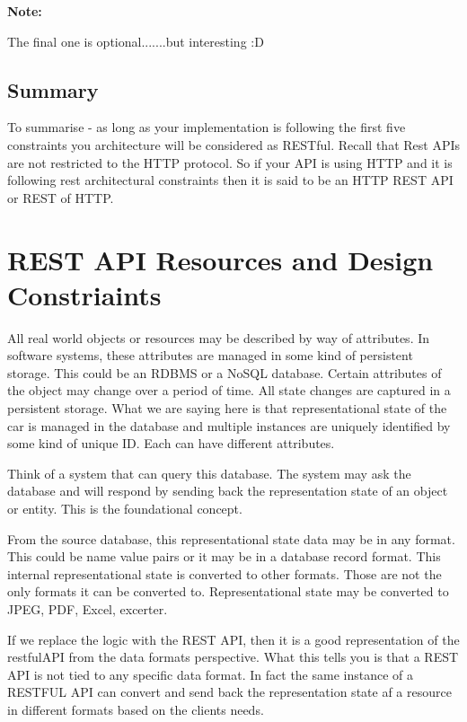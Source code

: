 \documentclass[a4paper, 11pt]{book}
\newenvironment{note}{
    \begin{siderule}
        \textbf{Note: }
        }{
    \end{siderule}
}
\begin{document}
    \begin{note}
        The final one is optional.......but interesting :D
    \end{note}

    \subsection{Summary}
    To summarise - as long as your implementation is following the first five constraints you architecture will be considered as RESTful.
    Recall that Rest APIs are not restricted to the HTTP protocol.
    So if your API is using HTTP and it is following rest architectural constraints then it is said to be an HTTP REST API or REST of HTTP.


    \section{REST API Resources and Design Constriaints}
    All real world objects or resources may be described by way of attributes.
    In software systems, these attributes are managed in some kind of persistent storage.
    This could be an RDBMS or a NoSQL database.
    Certain attributes of the object may change over a period of time.
    All state changes are captured in a persistent storage.
    What we are saying here is that representational state of the car is managed in the database and multiple instances are uniquely identified by some kind of unique ID.
    Each can have different attributes.

    Think of a system that can query this database.
    The system may ask the database and will respond by sending back the representation state of an object or entity.
    This is the foundational concept.

    From the source database, this representational state data may be in any format.
    This could be name value pairs or it may be in a database record format.
    This internal representational state is converted to other formats.
    Those are not the only formats it can be converted to.
    Representational state may be converted to JPEG, PDF, Excel, excerter.

    If we replace the logic with the REST API, then it is a good representation of the restfulAPI from the data formats perspective.
    What this tells you is that a REST API is not tied to any specific data format.
    In fact the same instance of a RESTFUL API can convert and send back the representation state af a resource in different formats based on the clients needs.
\end{document}
